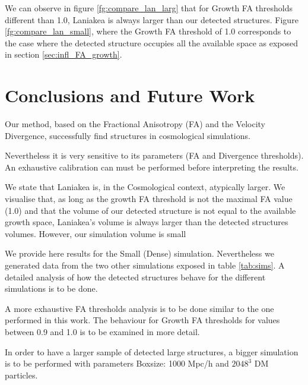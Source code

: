 \documentclass[12pt]{article}
\begin{document}
\begin{par}
We can observe in figure \ref{fg:compare_lan_larg}  that for Growth FA thresholds
 different than 1.0, Laniakea is always larger than
  our detected structures. Figure \ref{fg:compare_lan_small}, where the Growth FA threshold
   of 1.0 corresponds to the case where the
    detected structure occupies all the available
     space as exposed in section
      \ref{sec:infl_FA_growth}.
\end{par}



\section{Conclusions and Future Work}
\label{sec:discussions}
\begin{par}
Our method, based on the Fractional Anisotropy (FA) and the Velocity Divergence, successfully find structures in cosmological simulations. \\
\end{par}
\begin{par}
Nevertheless it is very sensitive to its parameters (FA and Divergence thresholds). An exhaustive calibration can must be performed before interpreting the results.\\
\end{par}
\begin{par}
We state that Laniakea is, in the Cosmological
 context, atypically larger. We visualise that, as
  long as the growth FA threshold is not the
   maximal FA value (1.0) and that the volume of
    our detected structure is not equal to the
     available growth space, Laniakea's volume is
      always larger than the detected structures
       volumes. However, our simulation volume is small\\
\end{par}


\begin{par}
We provide here results for the Small (Dense)
 simulation. Nevertheless we generated data from
  the two other simulations exposed in table
   \ref{tab:sims}. A detailed analysis of how the
    detected structures behave for the different
     simulations is to be done.\\
\end{par}
\begin{par}
A more exhaustive FA thresholds analysis is to be
 done similar to the one performed in this work.
  The behaviour for Growth FA thresholds for values
   between 0.9 and 1.0 is to be examined in more
    detail.
\end{par}
\begin{par}
In order to have a larger sample of detected large
 structures, a bigger simulation is to be performed
  with parameters Boxsize: 1000 Mpc/h and $2048^3$
   DM particles. \\
\end{par}
\end{document}
